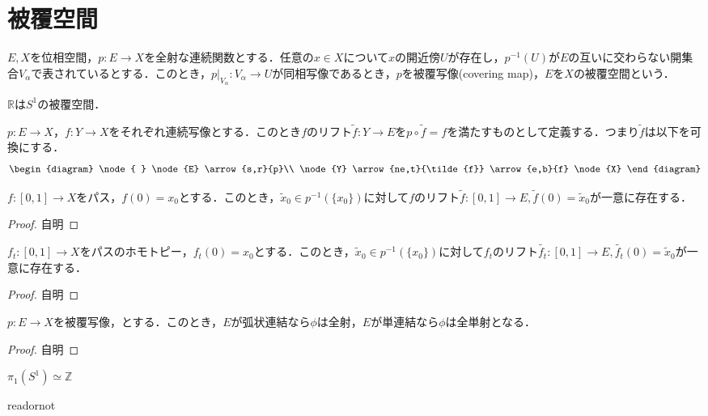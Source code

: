 \documentclass[uplatex]{jsarticle}
\renewcommand{\restriction}[2]{\left. #1 \right|_{#2}}
\begin{document}
\fi

\section{被覆空間}
\begin{teigi}[被覆空間]
  $E,X$を位相空間，$p\colon E \to X$を全射な連続関数とする．任意の$x\in X$について$x$の開近傍$U$が存在し，$p^{-1}(U)$が$E$の互いに交わらない開集合$V_\alpha$で表されているとする．このとき，$\restriction{p}{V_\alpha} \colon V_\alpha \to U$が同相写像であるとき，$p$を被覆写像(covering map)，$E$を$X$の被覆空間という．
\end{teigi}

\begin{rei}
  $\mathbb{R}$は$S^1$の被覆空間．
\end{rei}

\begin{teigi}[リフト]
  $p\colon E\to X$，$f\colon Y\to X$をそれぞれ連続写像とする．このとき$f$のリフト$\tilde{f}\colon Y\to E$を$p\circ \tilde{f} = f$を満たすものとして定義する．つまり$\tilde{f}$は以下を可換にする．
  \begin{align*}
    \begin{diagram}
      \node{ } \node{E} \arrow{s,r}{p}\\
      \node{Y} \arrow{ne,t}{\tilde{f}} \arrow{e,b}{f} \node{X}
    \end{diagram}
  \end{align*}
\end{teigi}

\begin{teiri}
  $f\colon \left[0,1\right]\to X$をパス，$f(0)=x_0$とする．このとき，$\tilde{x}_0 \in p^{-1}(\{x_0\})$に対して$f$のリフト$\tilde{f}\colon \left[0,1\right]\to E,\tilde{f}(0)=\tilde{x}_0$が一意に存在する．
\end{teiri}
\begin{proof}
  自明
\end{proof}

\begin{teiri}
  $f_t \colon \left[0,1\right]\to X$をパスのホモトピー，$f_t(0)=x_0$とする．このとき，$\tilde{x}_0 \in p^{-1}(\{x_0\})$に対して$f_t$のリフト$\tilde{f_t}\colon \left[0,1\right]\to E,\tilde{f_t}(0)=\tilde{x}_0$が一意に存在する．
\end{teiri}
\begin{proof}
  自明
\end{proof}
\begin{teiri}
  $p\colon E\to X$を被覆写像，とする．このとき，$E$が弧状連結なら$\phi$は全射，$E$が単連結なら$\phi$は全単射となる．
\end{teiri}
\begin{proof}
  自明
\end{proof}
\begin{teiri}
  $\pi_1(S^1) \simeq \mathbb{Z}$
\end{teiri}

\expandafter\ifx\csname readornot\endcsname\relax
  
\end{document}
